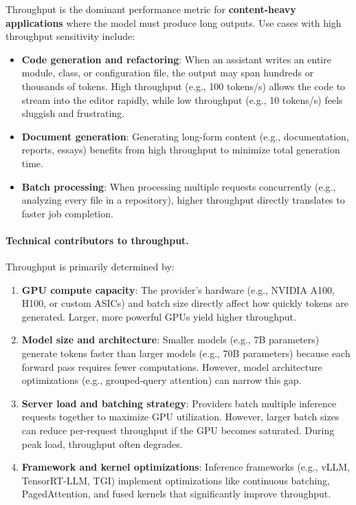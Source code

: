 \documentclass[english]{article}
\begin{document}
Throughput is the dominant performance metric for \textbf{content-heavy applications} where the model must produce long outputs. Use cases with high throughput sensitivity include:
\begin{itemize}
    \item \textbf{Code generation and refactoring}: When an assistant writes an entire module, class, or configuration file, the output may span hundreds or thousands of tokens. High throughput (e.g., 100 tokens/s) allows the code to stream into the editor rapidly, while low throughput (e.g., 10 tokens/s) feels sluggish and frustrating.
    \item \textbf{Document generation}: Generating long-form content (e.g., documentation, reports, essays) benefits from high throughput to minimize total generation time.
    \item \textbf{Batch processing}: When processing multiple requests concurrently (e.g., analyzing every file in a repository), higher throughput directly translates to faster job completion.
\end{itemize}

\paragraph{Technical contributors to throughput.}

Throughput is primarily determined by:
\begin{enumerate}
    \item \textbf{GPU compute capacity}: The provider's hardware (e.g., NVIDIA A100, H100, or custom ASICs) and batch size directly affect how quickly tokens are generated. Larger, more powerful GPUs yield higher throughput.
    \item \textbf{Model size and architecture}: Smaller models (e.g., 7B parameters) generate tokens faster than larger models (e.g., 70B parameters) because each forward pass requires fewer computations. However, model architecture optimizations (e.g., grouped-query attention) can narrow this gap.
    \item \textbf{Server load and batching strategy}: Providers batch multiple inference requests together to maximize GPU utilization. However, larger batch sizes can reduce per-request throughput if the GPU becomes saturated. During peak load, throughput often degrades.
    \item \textbf{Framework and kernel optimizations}: Inference frameworks (e.g., vLLM, TensorRT-LLM, TGI) implement optimizations like continuous batching, PagedAttention, and fused kernels that significantly improve throughput.
\end{enumerate}
\end{document}
